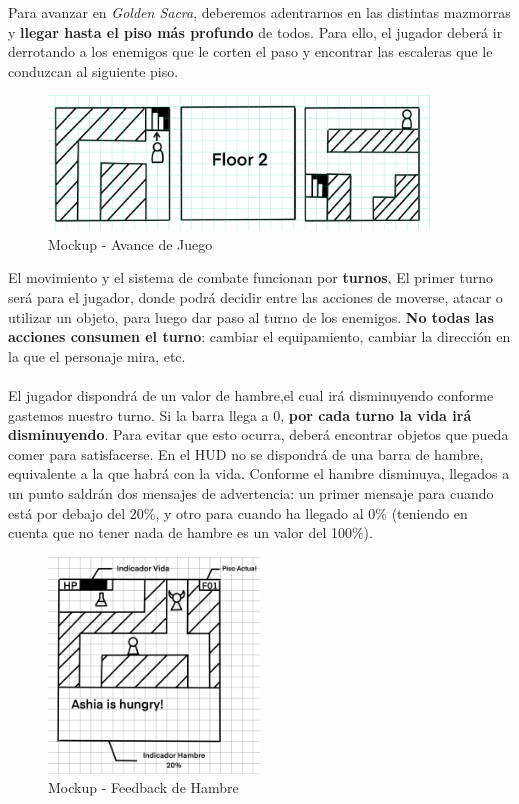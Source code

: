 Para avanzar en \textit{Golden Sacra}, deberemos adentrarnos en las distintas mazmorras y \textbf{llegar hasta el piso más profundo} de todos. Para ello, el jugador deberá ir derrotando a los enemigos que le corten el paso y encontrar las escaleras que le conduzcan al siguiente piso.

\clearpage

\begin{figure}[h]
\centering
\includegraphics[width=0.9\textwidth]{include/images/gdd/gdd_floors.png}
\caption{Mockup - Avance de Juego}
\label{figure:protagonist}
\end{figure}

El movimiento y el sistema de combate funcionan por \textbf{turnos}. El primer turno será para el jugador, donde podrá decidir entre las acciones de moverse, atacar o utilizar un objeto, para luego dar paso al turno de los enemigos. \textbf{No todas las acciones consumen el turno}: cambiar el equipamiento, cambiar la dirección en la que el personaje mira, etc.
\\ \\
El jugador dispondrá de un valor de hambre,el cual irá disminuyendo conforme gastemos nuestro turno. Si la barra llega a 0, \textbf{por cada turno la vida irá disminuyendo}. Para evitar que esto ocurra, deberá encontrar objetos que pueda comer para satisfacerse. En el HUD no se dispondrá de una barra de hambre, equivalente a la que habrá con la vida. Conforme el hambre disminuya, llegados a un punto saldrán dos mensajes de advertencia: un primer mensaje para cuando está por debajo del 20\%, y otro para cuando ha llegado al 0\% (teniendo en cuenta que no tener nada de hambre es un valor del 100\%).

\begin{figure}[h]
\centering
\includegraphics[width=0.5\textwidth]{include/images/gdd/gdd_hungry.png}
\caption{Mockup - Feedback de Hambre}
\label{figure:protagonist}
\end{figure}

